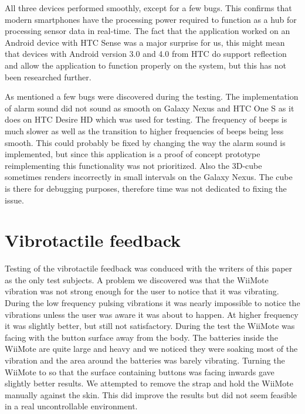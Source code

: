All three devices performed smoothly, except for a few bugs. This confirms that modern smartphones have the processing power required to function as a hub for processing sensor data in real-time. The fact that the application worked on an Android device with HTC Sense was a major surprise for us, this might mean that devices with Android version 3.0 and 4.0 from HTC do support reflection and allow the application to function properly on the system, but this has not been researched further.

As mentioned a few bugs were discovered during the testing. The implementation of alarm sound did not sound as smooth on Galaxy Nexus and HTC One S as it does on HTC Desire HD which was used for testing. The frequency of beeps is much slower as well as the transition to higher frequencies of beeps being less smooth. This could probably be fixed by changing the way the alarm sound is implemented, but since this application is a proof of concept prototype reimplementing this functionality was not prioritized. Also the 3D-cube sometimes renders incorrectly in small intervals on the Galaxy Nexus. The cube is there  for debugging purposes, therefore time was not dedicated to fixing the issue.

\section{Vibrotactile feedback}
Testing of the vibrotactile feedback was conduced with the writers of this paper as the only test subjects. A problem we discovered was that the WiiMote vibration was not strong enough for the user to notice that it was vibrating. During the low frequency pulsing vibrations it was nearly impossible to notice the vibrations unless the user was aware it was about to happen. At higher frequency it was slightly better, but still not satisfactory. During the test the WiiMote was facing with the button surface away from the body. The batteries inside the WiiMote are quite large and heavy and we noticed they were soaking most of the vibration and the area around the batteries was barely vibrating. Turning the WiiMote to  so that the surface containing buttons was facing inwards gave slightly better results. We attempted to remove the strap and hold the WiiMote manually against the skin. This did improve the results but did not seem feasible in a real uncontrollable environment.
